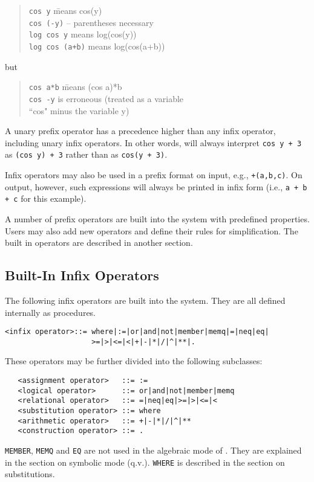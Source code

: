 \begin{quote}
\begin{tabbing}
{\tt cos y} \hspace{1.75in} \= means cos(y) \\
{\tt cos (-y)} \> -- parentheses necessary \\
{\tt log cos y} \>   means log(cos(y)) \\
{\tt log cos (a+b)} \> means log(cos(a+b))
\end{tabbing}
\end{quote}
but
\begin{quote}
\begin{tabbing}
{\tt cos a*b} \hspace{1.6in} \= means (cos a)*b \\
{\tt cos -y}  \> is erroneous (treated as a variable \\
\> ``cos" minus the variable y)
\end{tabbing}
\end{quote}
A unary prefix operator has a precedence
 higher than any infix operator, including
unary infix operators. 
In other words, {\REDUCE} will always interpret {\tt cos~y + 3} as
{\tt (cos~y) + 3} rather than as {\tt cos(y + 3)}.

Infix operators may also be used in a prefix format on input, e.g.,
{\tt +(a,b,c)}.  On output, however, such expressions will always be
printed in infix form (i.e., {\tt a + b + c} for this example).

A number of prefix operators are built into the system with predefined
properties. Users may also add new operators and define their rules for
simplification. The built in operators are described in another section.

\subsection*{Built-In Infix Operators}

The following infix operators are built into the
system.  They are all defined internally as procedures.
\begin{verbatim}
<infix operator>::= where|:=|or|and|not|member|memq|=|neq|eq|
                    >=|>|<=|<|+|-|*|/|^|**|.
\end{verbatim}
These operators may be further divided into the following subclasses:
\begin{verbatim}
   <assignment operator>   ::= :=
   <logical operator>      ::= or|and|not|member|memq
   <relational operator>   ::= =|neq|eq|>=|>|<=|<
   <substitution operator> ::= where
   <arithmetic operator>   ::= +|-|*|/|^|**
   <construction operator> ::= .
\end{verbatim}
{\tt MEMBER}, {\tt MEMQ} and {\tt EQ} are not used in the algebraic mode of
{\REDUCE}.  They are explained in the section on symbolic mode (q.v.).
{\tt WHERE} is described in the section on substitutions.

